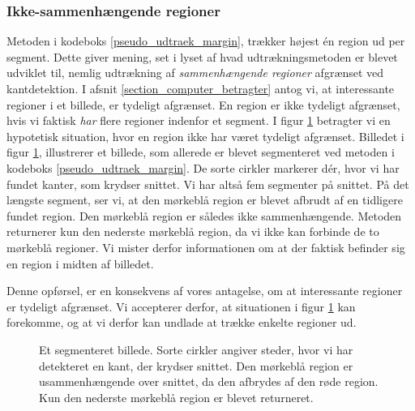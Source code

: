 {\subsubsection{Ikke-sammenhængende regioner}
Metoden i kodeboks \ref{pseudo_udtraek_margin}, trækker højest én region
ud per segment. Dette giver mening, set i lyset af hvad
udtrækningsmetoden er blevet udviklet til, nemlig udtrækning af
\emph{sammenhængende regioner} afgrænset ved kantdetektion. I afsnit
\ref{section_computer_betragter} antog vi, at interessante regioner i et
billede, er tydeligt afgrænset. En region er ikke tydeligt afgrænset,
hvis vi faktisk \emph{har} flere regioner indenfor et segment. I figur
\ref{usammenhaengende_region} betragter vi en hypotetisk situation, hvor
en region ikke har været tydeligt afgrænset. Billedet i figur
\ref{usammenhaengende_region}, illustrerer et billede, som allerede er
blevet segmenteret ved metoden i kodeboks \ref{pseudo_udtraek_margin}.
De sorte cirkler markerer dér, hvor vi har fundet kanter, som krydser
snittet. Vi har altså fem segmenter på snittet. På det længste segment,
ser vi, at den mørkeblå region er blevet afbrudt af en tidligere fundet
region. Den mørkeblå region er således ikke sammenhængende. Metoden
returnerer kun den nederste mørkeblå region, da vi ikke kan forbinde
de to mørkeblå regioner. Vi mister derfor informationen om at der
faktisk befinder sig en region i midten af billedet.

Denne opførsel, er en konsekvens af vores antagelse, om at interessante
regioner er tydeligt afgrænset. Vi accepterer derfor, at situationen i
figur \ref{usammenhaengende_region} kan forekomme, og at vi derfor kan
undlade at trække enkelte regioner ud.

\begin{figure}[t]
    \setlength\fboxsep{0pt}
    \setlength\fboxrule{0.5pt}
    \centering
    \caption[]{Et segmenteret billede. Sorte cirkler angiver steder,
    hvor vi har detekteret en kant, der krydser snittet. Den mørkeblå
    region er usammenhængende over snittet, da den afbrydes af den røde
    region. Kun den nederste mørkeblå region er blevet returneret.}
    \label{usammenhaengende_region}
\end{figure}

}
